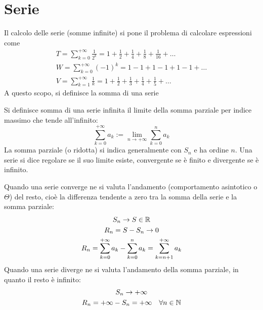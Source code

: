 %
%
%
%


\section{Serie}
Il calcolo delle serie (somme infinite) si pone il problema di calcolare espressioni come
\begin{gather}
	\label{serie:T}
	T=\sum_{k=0}^{+\infty}\frac{1}{2^k}=1+\frac{1}{2}+\frac{1}{4}+\frac{1}{8}+\frac{1}{16}+\dots\\
	\label{serie:W}
	W=\sum_{k=0}^{+\infty}(-1)^k=1-1+1-1+1-1+\dots\\
	\label{serie:V}
	V=\sum_{k=1}^{+\infty}\frac{1}{k}=1+\frac{1}{2}+\frac{1}{3}+\frac{1}{4}+\frac{1}{5}+\dots
\end{gather}
A questo scopo, si definisce la somma di una serie
\begin{defin}
	Si definisce somma di una serie infinita il limite della somma parziale per indice massimo che tende all'infinito:
	\[
		\sum_{k=0}^{+\infty} a_k:=\lim_{n\to+\infty}\sum_{k=0}^n a_k
	\]
	La somma parziale (o ridotta) si indica generalmente con $S_n$ e ha ordine $n$. Una serie si dice regolare se il suo limite esiste, convergente se è finito e divergente se è infinito.
\end{defin}

Quando una serie converge ne si valuta l'andamento (comportamento asintotico o $\Theta$) del resto, cioè la differenza tendente a zero tra la somma della serie e la somma parziale:
\begin{gather*}
	S_n\to S\in\mathbb{R}\\
	R_n=S-S_n\to0\\
	R_n=\sum_{k=0}^{+\infty}a_k-\sum_{k=0}^n a_k=\sum_{k=n+1}^{+\infty} a_k
\end{gather*}
Quando una serie diverge ne si valuta l'andamento della somma parziale, in quanto il resto è infinito:
\begin{gather*}
	S_n\to+\infty\\
	R_n=+\infty-S_n=+\infty\quad\forall n\in\mathbb{N}
\end{gather*}


